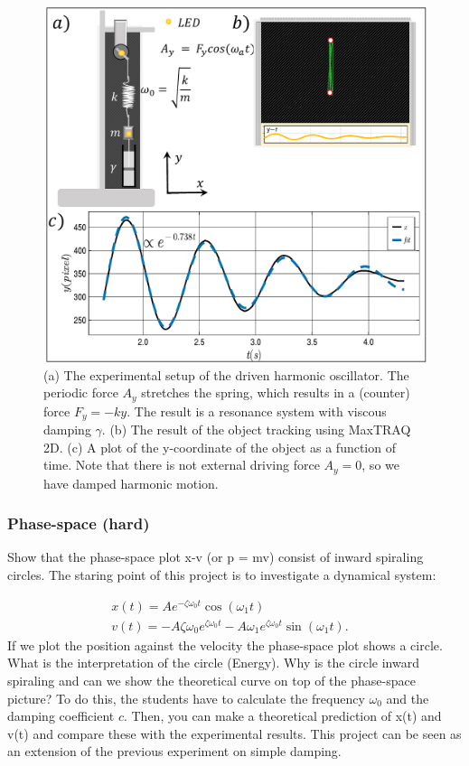 \documentclass{article}
\begin{document}
\begin{figure}
    \includegraphics[width=12 cm]{figures/Damped Harmonic Motion.pdf}
    \caption{(a) The experimental setup of the driven harmonic oscillator. The periodic force $A_y$ stretches the spring, which results in a (counter) force $F_y = -ky$. The result is a resonance system with viscous damping $\gamma$. (b) The result of the object tracking using MaxTRAQ 2D. (c) A plot of the y-coordinate of the object as a function of time. Note that there is not external driving force $A_y=0$, so we have damped harmonic motion.}
    \label{Figure: DDHM}
\end{figure}

\subsubsection{Phase-space (hard)}    
Show that the phase-space plot x-v (or p = mv) consist of inward spiraling circles. The staring point of this project is to investigate a dynamical system:

\begin{align}
    x(t) = Ae^{-\zeta\omega_0t}\cos(\omega_1 t) & \\
    v(t) = -A \zeta \omega_0 e^{\zeta \omega_0 t} - A \omega_1e^{\zeta \omega_0 t}\sin(\omega_1 t).
\end{align}
If we plot the position against the velocity the phase-space plot shows a circle. What is the interpretation of the circle (Energy). Why is the circle inward spiraling and can we show the theoretical curve on top of the phase-space picture? To do this, the students have to calculate the frequency $\omega_0$ and the damping coefficient $c$. Then, you can make a theoretical prediction of x(t) and v(t) and compare these with the experimental results. This project can be seen as an extension of the previous experiment on simple damping.
\end{document}
